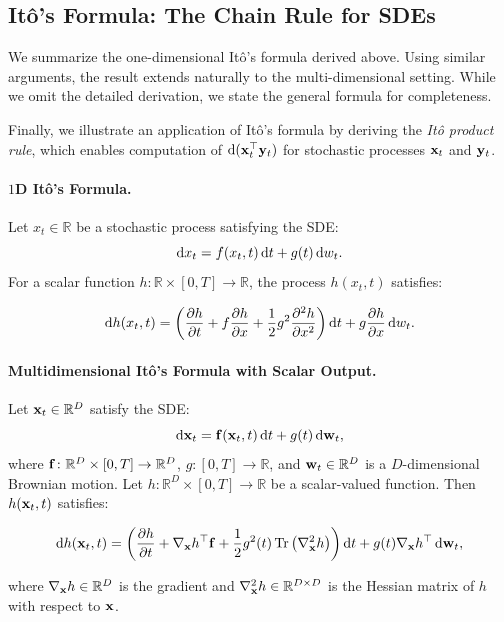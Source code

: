 \subsection{It\^o's Formula: The Chain Rule for SDEs}
\label{subsec:ito-summary}
We summarize the one-dimensional It\^o's formula derived above. Using similar arguments, the result extends naturally to the multi-dimensional setting. While we omit the detailed derivation, we state the general formula for completeness.

Finally, we illustrate an application of It\^o's formula by deriving the \emph{It\^o product rule}, which enables computation of $\mathop{}\!\mathrm{d}({\mathbf{x}}_t^\top {\mathbf{y}}_t)$ for stochastic processes ${\mathbf{x}}_t$ and ${\mathbf{y}}_t$.

\paragraph{$1$D It\^o's Formula.}
Let $x_t \in \mathbb{R}$ be a stochastic process satisfying the SDE:
\[
\mathop{}\!\mathrm{d} x_t = f(x_t, t) \mathop{}\!\mathrm{d} t + g(t) \mathop{}\!\mathrm{d} w_t.
\]
For a scalar function $h \colon \mathbb{R} \times [0, T] \to \mathbb{R}$, the process $h(x_t, t)$ satisfies:
\begin{mdframed}
\[
\mathop{}\!\mathrm{d} h(x_t, t)
= \left( \frac{\partial h}{\partial t} + f \frac{\partial h}{\partial x}
+ \frac{1}{2} g^2 \frac{\partial^2 h}{\partial x^2} \right) \mathop{}\!\mathrm{d} t
+ g \frac{\partial h}{\partial x} \mathop{}\!\mathrm{d} w_t.
\]
\end{mdframed}


\paragraph{Multidimensional It\^o's Formula with Scalar Output.}
Let ${\mathbf{x}}_t \in \mathbb{R}^D$ satisfy the SDE:
\[
\mathop{}\!\mathrm{d} {\mathbf{x}}_t = {\mathbf{f}}({\mathbf{x}}_t, t) \mathop{}\!\mathrm{d} t + g(t) \mathop{}\!\mathrm{d} {\mathbf{w}}_t,
\]
where ${\mathbf{f}} \colon \mathbb{R}^D \times [0, T] \to \mathbb{R}^D$, $g \colon [0, T] \to \mathbb{R}$, and ${\mathbf{w}}_t \in \mathbb{R}^D$ is a $D$-dimensional Brownian motion. Let $h \colon \mathbb{R}^D \times [0, T] \to \mathbb{R}$ be a scalar-valued function. Then $h({\mathbf{x}}_t, t)$ satisfies:
\begin{mdframed}
\begin{align}\label{eq:Ito-scalar}
    \mathop{}\!\mathrm{d} h({\mathbf{x}}_t, t)
= \left( \frac{\partial h}{\partial t}
+ \nabla_{{\mathbf{x}}} h^\top {\mathbf{f}}
+ \frac{1}{2} g^2(t) \operatorname{Tr} \left( \nabla^2_{{\mathbf{x}}} h \right) \right) \mathop{}\!\mathrm{d} t
+ g(t) \nabla_{{\mathbf{x}}} h^\top \mathop{}\!\mathrm{d} {\mathbf{w}}_t,
\end{align}
\end{mdframed}
where $\nabla_{{\mathbf{x}}} h \in \mathbb{R}^D$ is the gradient and $\nabla^2_{{\mathbf{x}}} h \in \mathbb{R}^{D \times D}$ is the Hessian matrix of $h$ with respect to ${\mathbf{x}}$.


